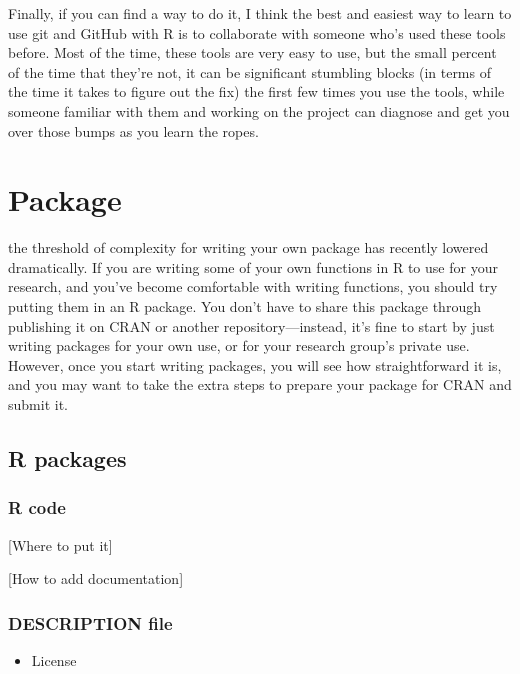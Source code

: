 \documentclass[]{tufte-book}
\providecommand{\tightlist}{%
  \setlength{\itemsep}{0pt}\setlength{\parskip}{0pt}}
\begin{document}
Finally, if you can find a way to do it, I think the best and easiest way to learn to use git
and GitHub with R is to collaborate with someone who's used these tools before. Most of the
time, these tools are very easy to use, but the small percent of the time that they're not,
it can be significant stumbling blocks (in terms of the time it takes to figure out the fix)
the first few times you use the tools, while someone familiar with them and working on the
project can diagnose and get you over those bumps as you learn the ropes.

\hypertarget{package}{%
\chapter{Package}\label{package}}

 the threshold of complexity
for writing your own package has recently lowered dramatically. If you are writing
some of your own functions in R to use for your research, and you've become comfortable
with writing functions, you should try putting them in an R package. You don't have
to share this package through publishing it on CRAN or another repository---instead, it's
fine to start by just writing packages for your own use, or for your research group's
private use. However, once you start writing packages, you will see how straightforward
it is, and you may want to take the extra steps to prepare your package for CRAN and
submit it.

\hypertarget{r-packages}{%
\section{R packages}\label{r-packages}}

\hypertarget{r-code}{%
\subsection{R code}\label{r-code}}

{[}Where to put it{]}

{[}How to add documentation{]}

\hypertarget{description-file}{%
\subsection{DESCRIPTION file}\label{description-file}}

\begin{itemize}
\tightlist
\item
  License
\end{itemize}
\end{document}
